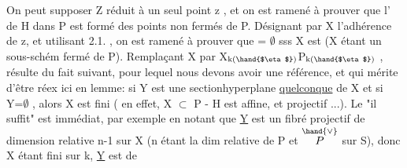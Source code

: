 On peut supposer Z réduit à un seul point z , et on est ramené à
prouver que l' de H dans P est formé  des points non fermés de P.
Désignant par X l'adhérence de z, et utilisant 2.1. , on est ramené à
prouver que \hand{$_\eta$} = $\emptyset$ sss X est   (X étant un sous-schém%
fermé  de P). Remplaçant X par X$_{\text{k(\hand{$\eta$})}}$\hand{$\hookrightarrow$}P$_{\text{k(\hand{$\eta$})}}$ ,   résulte du fait
\margin{$|$}suivant, pour lequel nous devons avoir une référence, et qui mérite d'être
réex ici en lemme: si Y est une sectionhyperplane \uline{quelconque} de
X et si Y\hand{\unsure{$_\eta$}}=$\emptyset$ , alors X est fini ( en effet, X $\subset$ P - H est affine, et
projectif ...). Le "il suffit" est immédiat, par exemple en notant que
\uline{Y} est un fibré projectif de dimension relative n-1 sur X (n étant la
dim relative de P  et $\overset{\hand{\vee}}{P}$ sur S), donc X étant fini sur k, \uline{Y} est de

